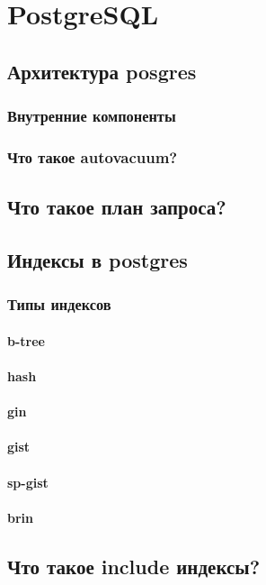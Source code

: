 \chapter{PostgreSQL}

\section{Архитектура posgres}
\subsection{Внутренние компоненты}
\subsection{Что такое autovacuum?}
\section{Что такое план запроса?}

\section{Индексы в postgres}

\subsection{Типы индексов}
\subsubsection{b-tree}
\subsubsection{hash}
\subsubsection{gin}
\subsubsection{gist}
\subsubsection{sp-gist}
\subsubsection{brin}

\section{Что такое include индексы?}
